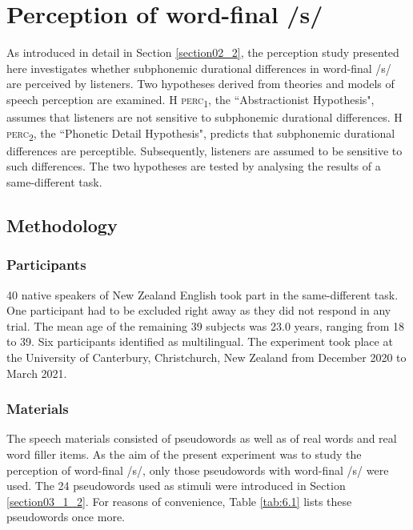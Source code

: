 \chapter{Perception of word-final /s/}\label{chapter06}

As introduced in detail in Section \ref{section02_2}, the perception study presented here investigates whether subphonemic durational differences in word-final /s/ are perceived by listeners. Two hypotheses derived from theories and models of speech perception are examined. \textsc{H perc\textsubscript{1}}, the ``Abstractionist Hypothesis", assumes that listeners are not sensitive to subphonemic durational differences. \textsc{H perc\textsubscript{2}}, the ``Phonetic Detail Hypothesis", predicts that subphonemic durational differences are perceptible. Subsequently, listeners are assumed to be sensitive to such differences. The two hypotheses are tested by analysing the results of a same-different task.

\section{Methodology}\label{section06_1}

\subsection{Participants}\label{section06_1_1}

40 native speakers of New Zealand English took part in the same-different task. One participant had to be excluded right away as they did not respond in any trial. The mean age of the remaining 39 subjects was 23.0 years, ranging from 18 to 39. Six participants identified as multilingual. The experiment took place at the University of Canterbury, Christchurch, New Zealand from December 2020 to March 2021. 

\subsection{Materials}\label{section06_1_2}

The speech materials consisted of pseudowords as well as of real words and real word filler items. As the aim of the present experiment was to study the perception of word-final /s/, only those pseudowords with word-final /s/ were used. The 24 pseudowords used as stimuli were introduced in Section \ref{section03_1_2}. For reasons of convenience, Table \ref{tab:6.1} lists these pseudowords once more.

